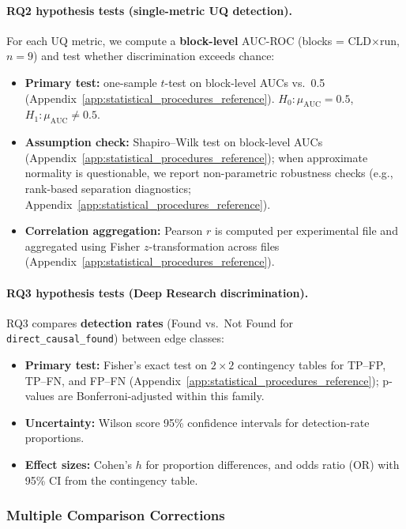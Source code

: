 \paragraph{RQ2 hypothesis tests (single-metric UQ detection).}
For each UQ metric, we compute a \textbf{block-level} AUC-ROC (blocks = CLD$\times$run, $n=9$) and test whether discrimination exceeds chance:
\begin{itemize}[noitemsep]
    \item \textbf{Primary test:} one-sample $t$-test on block-level AUCs vs.\ 0.5 (Appendix~\ref{app:statistical_procedures_reference}). $H_0:\mu_{\text{AUC}}=0.5$, $H_1:\mu_{\text{AUC}}\neq 0.5$.
    \item \textbf{Assumption check:} Shapiro--Wilk test on block-level AUCs (Appendix~\ref{app:statistical_procedures_reference}); when approximate normality is questionable, we report non-parametric robustness checks (e.g., rank-based separation diagnostics; Appendix~\ref{app:statistical_procedures_reference}).
    \item \textbf{Correlation aggregation:} Pearson $r$ is computed per experimental file and aggregated using Fisher $z$-transformation across files (Appendix~\ref{app:statistical_procedures_reference}).
\end{itemize}

\paragraph{RQ3 hypothesis tests (Deep Research discrimination).}
RQ3 compares \textbf{detection rates} (Found vs.\ Not Found for \texttt{direct\_causal\_found}) between edge classes:
\begin{itemize}[noitemsep]
    \item \textbf{Primary test:} Fisher's exact test on $2\times2$ contingency tables for TP--FP, TP--FN, and FP--FN (Appendix~\ref{app:statistical_procedures_reference}); p-values are Bonferroni-adjusted within this family.
    \item \textbf{Uncertainty:} Wilson score 95\% confidence intervals for detection-rate proportions.
    \item \textbf{Effect sizes:} Cohen's $h$ for proportion differences, and odds ratio (OR) with 95\% CI from the contingency table.
\end{itemize}

\subsubsection{Multiple Comparison Corrections}
\label{sec:multiple_comparisons}

